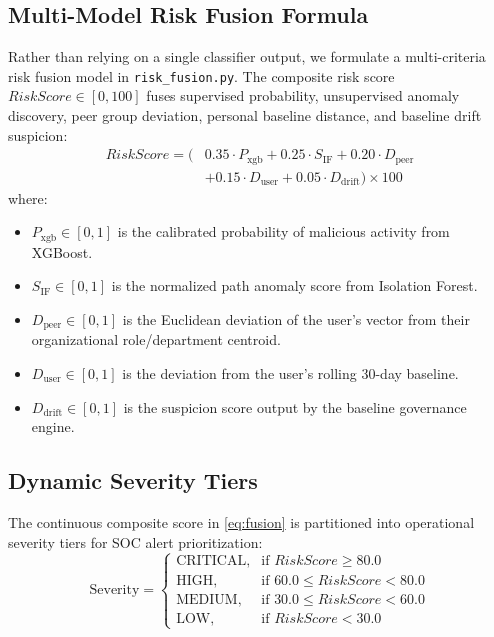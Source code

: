 \documentclass[conference]{IEEEtran}
\begin{document}
\subsection{Multi-Model Risk Fusion Formula}
Rather than relying on a single classifier output, we formulate a multi-criteria risk fusion model in \texttt{risk\_fusion.py}. The composite risk score $RiskScore \in [0, 100]$ fuses supervised probability, unsupervised anomaly discovery, peer group deviation, personal baseline distance, and baseline drift suspicion:
\begin{equation}
\begin{aligned}
    RiskScore = \Big(&0.35 \cdot P_{\text{xgb}} + 0.25 \cdot S_{\text{IF}} + 0.20 \cdot D_{\text{peer}} \\
    &+ 0.15 \cdot D_{\text{user}} + 0.05 \cdot D_{\text{drift}}\Big) \times 100
\end{aligned}
\label{eq:fusion}
\end{equation}
where:
\begin{itemize}
    \item $P_{\text{xgb}} \in [0, 1]$ is the calibrated probability of malicious activity from XGBoost.
    \item $S_{\text{IF}} \in [0, 1]$ is the normalized path anomaly score from Isolation Forest.
    \item $D_{\text{peer}} \in [0, 1]$ is the Euclidean deviation of the user's vector from their organizational role/department centroid.
    \item $D_{\text{user}} \in [0, 1]$ is the deviation from the user's rolling 30-day baseline.
    \item $D_{\text{drift}} \in [0, 1]$ is the suspicion score output by the baseline governance engine.
\end{itemize}

\subsection{Dynamic Severity Tiers}
The continuous composite score in \eqref{eq:fusion} is partitioned into operational severity tiers for SOC alert prioritization:
\begin{equation}
    \text{Severity} = 
    \begin{cases}
        \text{CRITICAL}, & \text{if } RiskScore \ge 80.0 \\
        \text{HIGH},     & \text{if } 60.0 \le RiskScore < 80.0 \\
        \text{MEDIUM},   & \text{if } 30.0 \le RiskScore < 60.0 \\
        \text{LOW},      & \text{if } RiskScore < 30.0
    \end{cases}
    \label{eq:severity}
\end{equation}
\end{document}
